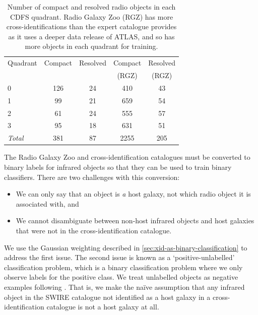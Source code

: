 \documentclass[fleqn,usenatbib,usedcolumn]{mnras}
\newcommand{\edited}[1]{{\bf {#1}}}
\begin{document}
    \begin{table}
      \caption{Number of compact and resolved radio objects in each CDFS
      quadrant. Radio Galaxy Zoo (RGZ) has more cross-identifications than the
      expert catalogue \citep{norris06} provides as it uses a deeper data release of ATLAS, and
      so has more objects in each quadrant for training.}
      \label{tab:radio-count}
      \begin{tabular}{lcccc}
        \hline
        Quadrant & Compact & Resolved & Compact & Resolved\\
        &&&(RGZ)&(RGZ)\\
        \hline
        0 & 126 & 24 & 410 & 43 \\
        1 & 99 & 21 & 659 & 54 \\
        2 & 61 & 24 & 555 & 57 \\
        3 & 95 & 18 & 631 & 51 \\
        \hline
        \textit{Total} & 381 & 87 & 2255 & 205\\
        \hline
      \end{tabular}
    \end{table}

    \edited{The Radio Galaxy Zoo and \citet{norris06} cross-identification
    catalogues must be converted to binary labels for infrared objects so that
    they can be used to train binary classifiers. There are two challenges with this conversion:
    \begin{itemize}
      \item We can only say that an object is \emph{a} host galaxy, not which radio object it is associated with, and
      \item We cannot disambiguate between non-host infrared objects and host galaxies that were not in the cross-identification catalogue.
    \end{itemize}
    
    We use the Gaussian weighting described in \autoref{sec:xid-as-binary-classification} to address the first issue.
    The second issue is known as a `positive-unlabelled' classification problem, which is
    a binary classification problem where we only observe labels for the
    positive class. We treat unlabelled objects as negative examples following
    \citet{menon15cpe}. That is, we make the na\"ive assumption that any
    infrared object in the SWIRE catalogue not identified as a host galaxy in a cross-identification catalogue is not a host galaxy at all.}
\end{document}
